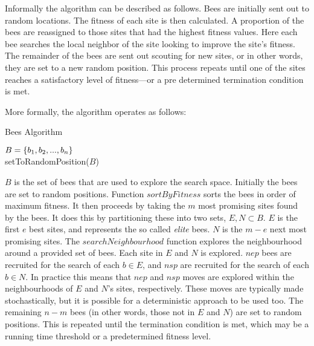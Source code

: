 
Informally the algorithm can be described as follows. Bees are initially sent out to random locations. The fitness of each site is then calculated. A proportion of the bees are reassigned to those sites that had the highest fitness values. Here each bee searches the local neighbor of the site looking to improve the site's fitness. The remainder of the bees are sent out scouting for new sites, or in other words, they are set to a new random position. This process repeats until one of the sites reaches a satisfactory level of fitness---or a pre determined termination condition is met.

More formally, the algorithm operates as follows:

\begin{algorithm}[H]
   \caption{Bees Algorithm}
   $B = \{b_1, b_2,..., b_n\}$\\
   setToRandomPosition($B$)\\
\end{algorithm}

$B$ is the set of bees that are used to explore the search space. Initially the bees are set to random positions. Function $sortByFitness$ sorts the bees in order of maximum fitness. It then proceeds by taking the $m$ most promising sites found by the bees. It does this by partitioning these into two sets, $E, N \subset B$. $E$ is the first $e$ best sites, and represents the so called \emph{elite} bees. $N$ is the $m - e$ next most promising sites. The $searchNeighbourhood$ function explores the neighbourhood around a provided set of bees. Each site in $E$ and $N$ is explored. $nep$ bees are recruited for the search of each $b \in E$, and $nsp$ are recruited for the search of each $b \in N$. In practice this means that $nep$ and $nsp$ moves are explored within the neighbourhoods of $E$ and $N$'s sites, respectively. These moves are typically made stochastically, but it is possible for a deterministic approach to be used too. The remaining $n - m$ bees (in other words, those not in $E$ and $N$) are set to random positions. This is repeated until the termination condition is met, which may be a running time threshold or a predetermined fitness level. 

